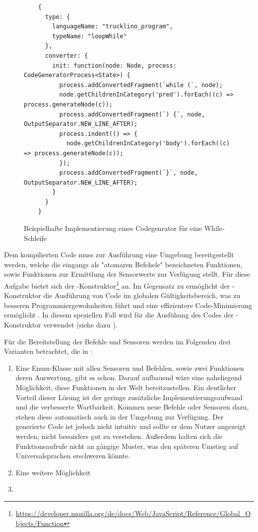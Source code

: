 \begin{figure}
  \begin{lstlisting}
    {
      type: {
        languageName: "trucklino_program",
        typeName: "loopWhile"
      },
      converter: {
        init: function(node: Node, process: CodeGeneratorProcess<State>) {
          process.addConvertedFragment(`while (`, node);
          node.getChildrenInCategory('pred').forEach((c) => process.generateNode(c));
          process.addConvertedFragment(`) {`, node, OutputSeparator.NEW_LINE_AFTER);
          process.indent(() => {
            node.getChildrenInCategory('body').forEach((c) => process.generateNode(c));
          });
          process.addConvertedFragment(`}`, node, OutputSeparator.NEW_LINE_AFTER);
        }
      }
    }
  \end{lstlisting}
  \caption{Beispielhafte Implementierung eines Codegenrator für eine While-Schleife}
  \label{fig:implementation:program:evaluation:while}
\end{figure}

Dem kompilierten Code muss zur Ausführung eine Umgebung bereitgestellt werden, welche die eingangs als "atomaren Befehele" bezeichneten Funktionen, sowie Funktionen zur Ermittlung der Sensorwerte zur Verfügung stellt. Für diese Aufgabe bietet sich der -Konstruktor\footnote{\url{https://developer.mozilla.org/de/docs/Web/JavaScript/Reference/Global_Objects/Function}} an. Im Gegensatz zu  ermöglicht der -Konstruktor die Ausführung von Code im globalen Gültigkeitsbereich, was zu besseren Programmiergewohnheiten führt und eine effizientere Code-Minimierung ermöglicht \cite{mdn-function}. In diesem speziellen Fall wird für die Ausfühung des Codes der -Konstruktor verwendet (siehe dazu ).

Für die Bereitstellung der Befehle und Sensoren werden im Folgenden drei Varianten betrachtet, die in :

\begin{enumerate}
  \item Eine Enum-Klasse mit allen Sensoren und Befehlen, sowie zwei Funktionen deren Auswertung, gibt es schon. Darauf aufbauend wäre eine naheliegend Möglichkeit, diese Funktionen in der Welt bereitzustellen. Ein deutlicher Vorteil dieser Lösung ist der geringe zusätzliche Implementierungsaufwand und die verbesserte Wartbarkeit. Kommen neue Befehle oder Sensoren dazu, stehen diese automatisch auch in der Umgebung zur Verfügung. Der generierte Code ist jedoch nicht intuitiv und sollte er dem Nutzer angezeigt werden, nicht besonders gut zu verstehen. Außerdem halten sich die Funktionsaufrufe nicht an gängige Muster, was den späteren Umstieg auf Universalsprachen erschweren könnte. 
  \item Eine weitere Möglichkeit 
  \item {}
\end{enumerate}

